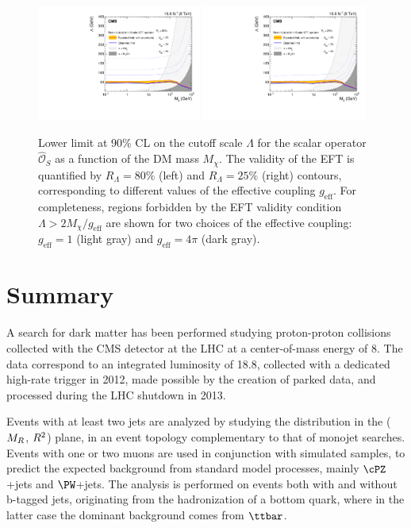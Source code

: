 \begin{figure}
\centering
  \includegraphics[width=0.48\textwidth]{Limits/Final_MonoB_R80percent_vNov9_2015_CWR.pdf}
  \includegraphics[width=0.48\textwidth]{Limits/Final_MonoB_R25percent_vNov9_2015_CWR.pdf}
\caption{Lower limit at 90\% CL on the cutoff scale $\Lambda$ for the
  scalar operator $\hat{\mathcal{O}}_{S}$ as a function of the DM mass
  $M_{\chi}$. The validity of the EFT is quantified by
  $R_\Lambda = 80\%$ (left) and $R_\Lambda = 25\%$ (right) contours,
  corresponding to different values of the effective coupling
  $g_\text{eff}$. For completeness, regions forbidden by the
  EFT validity condition $\Lambda > 2M_\chi/g_\text{eff}$  are shown for two choices of the
effective coupling:  $g_\text{eff} = 1$ (light gray) and $g_\text{eff}= 4\pi$ (dark gray).\label{fig:LimitLambdab}}
\end{figure}


\section{Summary}\label{sec:conclusions}

A search for dark matter has been performed studying proton-proton collisions collected
with the CMS detector at the LHC at a center-of-mass energy of
8\TeV. The data correspond to an integrated luminosity of
18.8\fbinv, collected with a dedicated high-rate trigger in 2012,
made possible by the creation of parked data, and processed during the LHC shutdown
in 2013.

Events with at least two jets are analyzed by studying the
distribution in the ($M_R$, $R^2$) plane, in an
event topology complementary to that of monojet searches. Events with one or
two muons are used in conjunction with simulated samples, to predict
the expected background from standard model processes, mainly
$\cPZ$+jets and $\PW$+jets. The analysis is performed on events both
with and without b-tagged jets, originating from the hadronization of
a bottom quark, where in the latter case the dominant background comes from
$\ttbar$.

